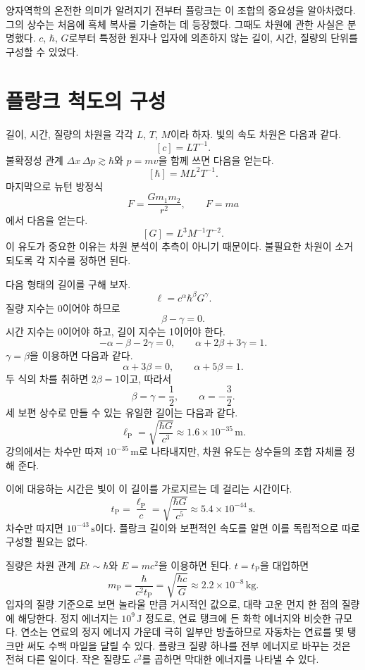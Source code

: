양자역학의 온전한 의미가 알려지기 전부터 플랑크는 이 조합의 중요성을 알아차렸다. 그의 상수는 처음에 흑체 복사를 기술하는 데 등장했다. 그때도 차원에 관한 사실은 분명했다. \(c\), \(\hbar\), \(G\)로부터 특정한 원자나 입자에 의존하지 않는 길이, 시간, 질량의 단위를 구성할 수 있었다.

\section{플랑크 척도의 구성}

길이, 시간, 질량의 차원을 각각 \(L\), \(T\), \(M\)이라 하자. 빛의 속도 차원은 다음과 같다.
\[
[c]=LT^{-1}.
\]
불확정성 관계 \(\Delta x\,\Delta p\gtrsim\hbar\)와 \(p=mv\)을 함께 쓰면 다음을 얻는다.
\[
[\hbar]=ML^2T^{-1}.
\]
마지막으로 뉴턴 방정식
\[
F=\frac{Gm_1m_2}{r^2},
\qquad
F=ma
\]
에서 다음을 얻는다.
\[
[G]=L^3M^{-1}T^{-2}.
\]
이 유도가 중요한 이유는 차원 분석이 추측이 아니기 때문이다. 불필요한 차원이 소거되도록 각 지수를 정하면 된다.

다음 형태의 길이를 구해 보자.
\begin{equation}
\ell=c^\alpha\hbar^\beta G^\gamma.
\label{eq:c10-length-ansatz}
\end{equation}
질량 지수는 0이어야 하므로
\[
\beta-\gamma=0.
\]
시간 지수는 0이어야 하고, 길이 지수는 1이어야 한다.
\[
-\alpha-\beta-2\gamma=0,
\qquad
\alpha+2\beta+3\gamma=1.
\]
\(\gamma=\beta\)을 이용하면 다음과 같다.
\[
\alpha+3\beta=0,
\qquad
\alpha+5\beta=1.
\]
두 식의 차를 취하면 \(2\beta=1\)이고, 따라서
\[
\beta=\gamma=\frac12,
\qquad
\alpha=-\frac32.
\]
세 보편 상수로 만들 수 있는 유일한 길이는 다음과 같다.
\begin{equation}
\ell_{\mathrm P}
=\sqrt{\frac{\hbar G}{c^3}}
\approx 1.6\times10^{-35}\,\mathrm m.
\label{eq:c10-planck-length}
\end{equation}
강의에서는 차수만 따져 \(10^{-35}\,\mathrm m\)로 나타내지만, 차원 유도는 상수들의 조합 자체를 정해 준다.

이에 대응하는 시간은 빛이 이 길이를 가로지르는 데 걸리는 시간이다.
\begin{equation}
t_{\mathrm P}
=\frac{\ell_{\mathrm P}}{c}
=\sqrt{\frac{\hbar G}{c^5}}
\approx 5.4\times10^{-44}\,\mathrm s.
\label{eq:c10-planck-time}
\end{equation}
차수만 따지면 \(10^{-43}\,\mathrm s\)이다. 플랑크 길이와 보편적인 속도를 알면 이를 독립적으로 따로 구성할 필요는 없다.

질량은 차원 관계 \(Et\sim\hbar\)와 \(E=mc^2\)을 이용하면 된다. \(t=t_{\mathrm P}\)을 대입하면
\begin{equation}
m_{\mathrm P}
=\frac{\hbar}{c^2t_{\mathrm P}}
=\sqrt{\frac{\hbar c}{G}}
\approx 2.2\times10^{-8}\,\mathrm{kg}.
\label{eq:c10-planck-mass}
\end{equation}
입자의 질량 기준으로 보면 놀라울 만큼 거시적인 값으로, 대략 고운 먼지 한 점의 질량에 해당한다. 정지 에너지는 \(10^9\,\mathrm J\) 정도로, 연료 탱크에 든 화학 에너지와 비슷한 규모다. 연소는 연료의 정지 에너지 가운데 극히 일부만 방출하므로 자동차는 연료를 몇 탱크만 써도 수백 마일을 달릴 수 있다. 플랑크 질량 하나를 전부 에너지로 바꾸는 것은 전혀 다른 일이다. 작은 질량도 \(c^2\)를 곱하면 막대한 에너지를 나타낼 수 있다.

